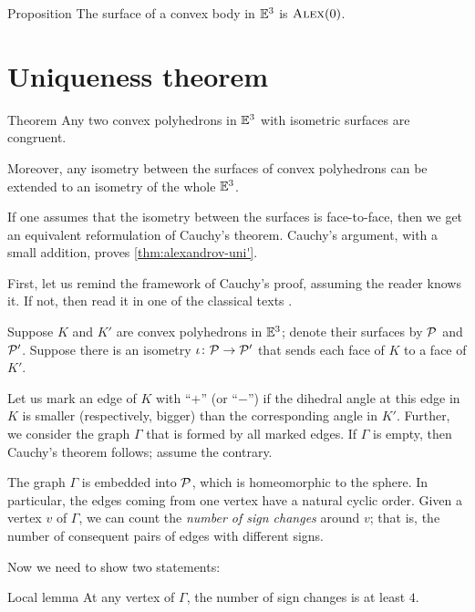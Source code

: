 \begin{thm}{Proposition}\label{prop:conv-surf-CBB(0)}
The surface of a convex body in $\mathbb{E}^3$ is $\textsc{Alex}(0)$.
\end{thm}

\section{Uniqueness theorem}

\begin{thm}{Theorem}\label{thm:alexandrov-uni'}
Any two convex polyhedrons in $\mathbb{E}^3$ with isometric surfaces are congruent.

Moreover, any isometry between the surfaces of convex polyhedrons can be extended to an isometry of the whole $\mathbb{E}^3$.
\end{thm}

If one assumes that the isometry between the surfaces is face-to-face,
then we get an equivalent reformulation of Cauchy's theorem.
Cauchy's argument, with a small addition, proves \ref{thm:alexandrov-uni'}.

First, let us remind the framework of Cauchy's proof, assuming the reader knows it.
If not, then read it in one of the classical texts \cite{aigner-zigler,dolbilin,tabacnikov-fuks}.

Suppose $K$ and $K'$ are convex polyhedrons in $\mathbb{E}^3$;
denote their surfaces
by $\mathcal{P}$ and $\mathcal{P}'$.
Suppose there is an isometry $\iota\colon\mathcal{P}\to \mathcal{P}'$ that sends each face of $K$ to a face of $K'$.

Let us mark an edge of $K$ with ``$+$'' (or ``$-$'') if the dihedral angle at this edge in $K$ is smaller (respectively, bigger) than the corresponding angle in $K'$.
Further, we consider the  graph $\Gamma$ that is formed by all marked edges.
If $\Gamma$ is empty, then Cauchy's theorem follows; assume the contrary.

The graph $\Gamma$ is embedded into $\mathcal{P}$, which is homeomorphic to the sphere.
In particular, the edges coming from one vertex have a natural cyclic order.
Given a vertex $v$ of $\Gamma$, we can count the \textit{number of sign changes} around $v$;
that is, the number of consequent pairs of edges with different signs.

Now we need to show two statements:

\begin{thm}{Local lemma}
At any vertex of $\Gamma$, the number of sign changes is at least $4$.
\end{thm}

